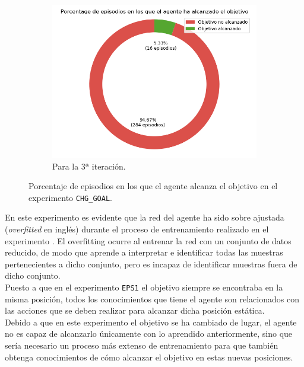 \begin{figure}
\begin{subfigure}{.5\textwidth}
    \end{subfigure}
    \begin{subfigure}{.5\textwidth}
        \centering
        \includegraphics[scale=0.3]{cap5_experimentacion/images/CHANGE_GOAL-20-09_21-06-42_it3_porcentajeResuelto.png}
        \caption{Para la 3ª iteración.}
        \label{fig:CHANGE_GOAL-20-09_21-06-42_it3_porcentajeResuelto}
    \end{subfigure}%
    \caption{Porcentaje de episodios en los que el agente alcanza el objetivo en el experimento \texttt{CHG\_GOAL}.}
    \label{fig:CHANGE_GOAL-20-09_21-06-42_porcentajeResuelto}
\end{figure}

En este experimento es evidente que la red del agente ha sido sobre ajustada (\textit{overfitted} en inglés) durante el proceso de entrenamiento realizado en el experimento . El overfitting ocurre al entrenar la red con un conjunto de datos reducido, de modo que aprende a interpretar e identificar todas las muestras pertenecientes a dicho conjunto, pero es incapaz de identificar muestras fuera de dicho conjunto. \\

Puesto a que en el experimento \texttt{EPS1} el objetivo siempre se encontraba en la misma posición, todos los conocimientos que tiene el agente son relacionados con las acciones que se deben realizar para alcanzar dicha posición estática. \\

Debido a que en este experimento el objetivo se ha cambiado de lugar, el agente no es capaz de alcanzarlo únicamente con lo aprendido anteriormente, sino que sería necesario un proceso más extenso de entrenamiento para que también obtenga conocimientos de cómo alcanzar el objetivo en estas nuevas posiciones. \\ 
 
